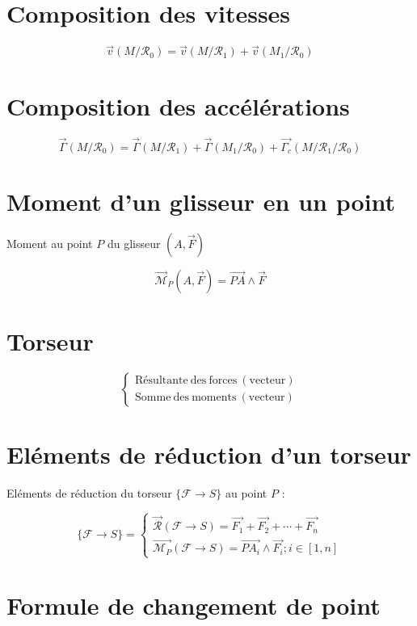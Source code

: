 \documentclass[a4paper, 11pt]{article}
\newcommand{\V}{\overrightarrow}
\newcommand{\R}{\mathcal{R}}
\newcommand{\F}{\mathcal{F}}
\newcommand{\M}{\mathcal{M}}
\begin{document}
\section{Composition des vitesses}

$$\V{v}(M/\R_0) = \V{v}(M/\R_1) + \V{v}(M_1/\R_0)$$

\section{Composition des accélérations}

$$\V{\Gamma}(M/\R_0) = \V{\Gamma}(M/\R_1) + \V{\Gamma}(M_1/\R_0) +\V{\Gamma_c}(M/\R_1/\R_0)$$


\section{Moment d'un glisseur en un point}

Moment au point $P$ du glisseur $(A,\V{F})$

$$\V{\M}_P(A,\V{F}) = \V{PA} \wedge \V{F}$$

\section{Torseur}

$$
\left\{
    \begin{array}{l}
        \mathrm{Résultante~des~forces~(vecteur)}\\
        \mathrm{Somme~des~moments~(vecteur)}
    \end{array}
\right.
$$

\section{Eléments de réduction d'un torseur}

Eléments de réduction du torseur $\{\F\rightarrow S\}$ au point $P$ :

$$
\{\F\rightarrow S\} = \left\{
    \begin{array}{l}
    \V{\R}(\F\rightarrow S) = \V{F_1} + \V{F_2} + \cdots + \V{F_n}\\
    \V{\M_P}(\F\rightarrow S) = \V{PA_i} \wedge \V{F_i} ; i \in [1, n]
    \end{array}
\right.
$$

\section{Formule de changement de point}
\end{document}
